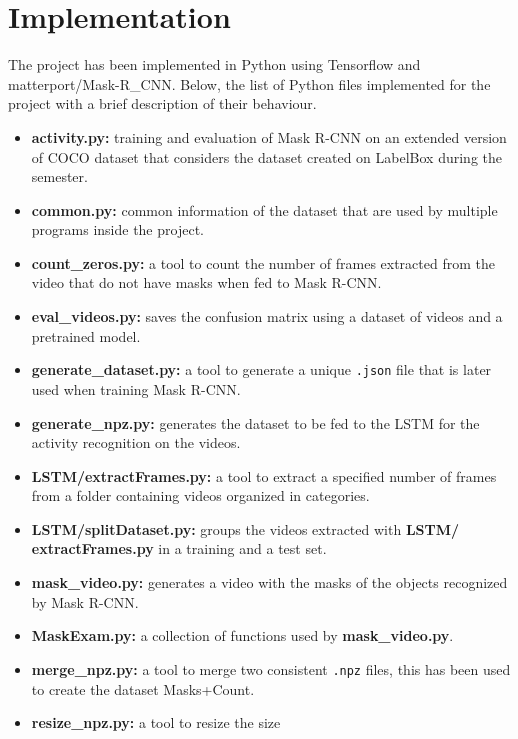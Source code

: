 \documentclass[12pt]{article}
\numberwithin{equation}{section} %
\numberwithin{figure}{section} %
\numberwithin{table}{section} %
\theoremstyle{definition}
\begin{document}
\section{Implementation}

The project has been implemented in Python using Tensorflow
and matterport/Mask-R\_CNN. Below, the list of Python files
implemented for the project with a brief description of
their behaviour.

\begin{itemize}
    \item \textbf{activity.py:} training and evaluation
        of Mask R-CNN on an extended version of COCO dataset
        that considers the dataset created on LabelBox
        during the semester.
    \item \textbf{common.py:} common information of the
        dataset that are used by multiple programs
        inside the project.
    \item \textbf{count\_zeros.py:} a tool to count the
        number of frames extracted from the video that
        do not have masks when fed to Mask R-CNN.
    \item \textbf{eval\_videos.py:} saves the confusion
        matrix using a dataset of videos and a pretrained
        model.
    \item \textbf{generate\_dataset.py:} a tool to generate
        a unique \texttt{.json} file that is later used
        when training Mask R-CNN.
    \item \textbf{generate\_npz.py:} generates the dataset
        to be fed to the LSTM for the activity recognition
        on the videos.
    \item \textbf{LSTM/extractFrames.py:} a tool to extract
        a specified number of frames from a folder
        containing videos organized in categories.
    \item \textbf{LSTM/splitDataset.py:} groups the
        videos extracted with \textbf{LSTM/ extractFrames.py}
        in a training and a test set.
    \item \textbf{mask\_video.py:} generates a video
        with the masks of the objects recognized by
        Mask R-CNN.
    \item \textbf{MaskExam.py:} a collection of functions
        used by \textbf{mask\_video.py}.
    \item \textbf{merge\_npz.py:} a tool to merge two
        consistent \texttt{.npz} files, this has been
        used to create the dataset Masks+Count.
    \item \textbf{resize\_npz.py:} a tool to resize the size

\end{itemize}
\end{document}
